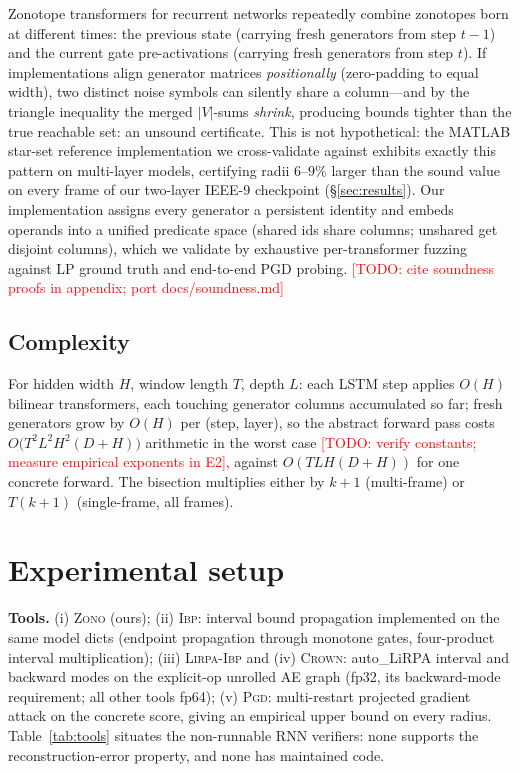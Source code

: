 \documentclass{article} %
\newcommand{\todo}[1]{\textcolor{red}{[TODO: #1]}}
\begin{document}
Zonotope transformers for recurrent networks repeatedly combine
zonotopes born at different times: the previous state (carrying fresh
generators from step $t{-}1$) and the current gate pre-activations
(carrying fresh generators from step $t$). If implementations align
generator matrices \emph{positionally} (zero-padding to equal width),
two distinct noise symbols can silently share a column---and by the
triangle inequality the merged $|V|$-sums \emph{shrink}, producing
bounds tighter than the true reachable set: an unsound certificate.
This is not hypothetical: the MATLAB star-set reference implementation
we cross-validate against exhibits exactly this pattern on multi-layer
models, certifying radii $6$--$9\%$ larger than the sound
value on every frame of our two-layer IEEE-9 checkpoint
(\S\ref{sec:results}). Our implementation assigns every generator a
persistent identity and embeds operands into a unified predicate space
(shared ids share columns; unshared get disjoint columns), which we
validate by exhaustive per-transformer fuzzing against LP ground truth
and end-to-end PGD probing. \todo{cite soundness proofs in appendix;
port docs/soundness.md}

\subsection{Complexity}

For hidden width $H$, window length $T$, depth $L$: each LSTM step
applies $O(H)$ bilinear transformers, each touching generator columns
accumulated so far; fresh generators grow by $O(H)$ per (step, layer),
so the abstract forward pass costs
$O\!\big(T^2 L^2 H^2 (D+H)\big)$ arithmetic in the worst case
\todo{verify constants; measure empirical exponents in E2}, against
$O(TLH(D+H))$ for one concrete forward. The bisection multiplies either
by $k{+}1$ (multi-frame) or $T(k{+}1)$ (single-frame, all frames).

\section{Experimental setup}
\label{sec:setup}

\textbf{Tools.} (i) \textsc{Zono} (ours); (ii) \textsc{Ibp}: interval
bound propagation implemented on the same model dicts (endpoint
propagation through monotone gates, four-product interval
multiplication); (iii) \textsc{Lirpa-Ibp} and (iv) \textsc{Crown}:
auto\_LiRPA \citep{xu2020automatic} interval and backward modes on the
explicit-op unrolled AE graph (fp32, its backward-mode requirement;
all other tools fp64); (v) \textsc{Pgd}: multi-restart projected
gradient attack on the concrete score, giving an empirical upper bound
on every radius. Table~\ref{tab:tools} situates the non-runnable RNN
verifiers: none supports the reconstruction-error property, and none
has maintained code.
\end{document}
